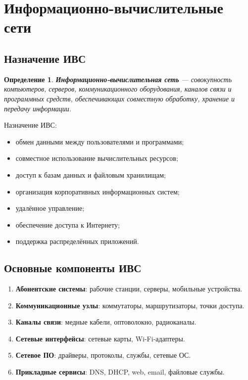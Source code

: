 \documentclass[12pt,a4paper]{article}
\newtheorem{definition}{Определение}
\begin{document}
\section{Информационно-вычислительные сети}

\subsection{Назначение ИВС}

\begin{definition}
\textbf{Информационно-вычислительная сеть} --- совокупность компьютеров, серверов, коммуникационного оборудования, каналов связи и программных средств, обеспечивающих совместную обработку, хранение и передачу информации.
\end{definition}

Назначение ИВС:
\begin{itemize}
    \item обмен данными между пользователями и программами;
    \item совместное использование вычислительных ресурсов;
    \item доступ к базам данных и файловым хранилищам;
    \item организация корпоративных информационных систем;
    \item удалённое управление;
    \item обеспечение доступа к Интернету;
    \item поддержка распределённых приложений.
\end{itemize}

\subsection{Основные компоненты ИВС}

\begin{enumerate}
    \item \textbf{Абонентские системы}: рабочие станции, серверы, мобильные устройства.
    \item \textbf{Коммуникационные узлы}: коммутаторы, маршрутизаторы, точки доступа.
    \item \textbf{Каналы связи}: медные кабели, оптоволокно, радиоканалы.
    \item \textbf{Сетевые интерфейсы}: сетевые карты, Wi-Fi-адаптеры.
    \item \textbf{Сетевое ПО}: драйверы, протоколы, службы, сетевые ОС.
    \item \textbf{Прикладные сервисы}: DNS, DHCP, web, email, файловые службы.
\end{enumerate}
\end{document}

